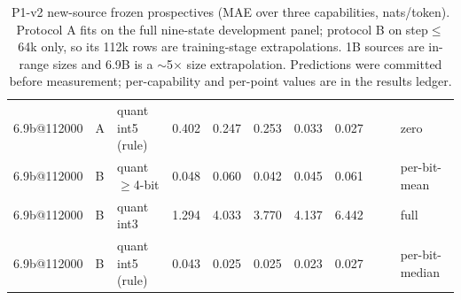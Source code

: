 \begin{table}[t]
\begin{tabular}{@{}lllrrrrrrrl@{}}
6.9b@112000 & A & quant int5 (rule) & 0.402 & 0.247 & 0.253 & 0.033 & 0.027 & & & zero \\
6.9b@112000 & B & quant $\ge$4-bit & 0.048 & 0.060 & 0.042 & 0.045 & 0.061 & & & per-bit-mean \\
6.9b@112000 & B & quant int3 & 1.294 & 4.033 & 3.770 & 4.137 & 6.442 & & & full \\
6.9b@112000 & B & quant int5 (rule) & 0.043 & 0.025 & 0.025 & 0.023 & 0.027 & & & per-bit-median \\
\bottomrule\end{tabular}
\caption{P1-v2 new-source frozen prospectives (MAE over three capabilities, nats/token). Protocol A fits on the full nine-state development panel; protocol B on step$\le$64k only, so its 112k rows are training-stage extrapolations. 1B sources are in-range sizes and 6.9B is a $\sim$5$\times$ size extrapolation. Predictions were committed before measurement; per-capability and per-point values are in the results ledger.}
\label{tab:p1v2}\end{table}
